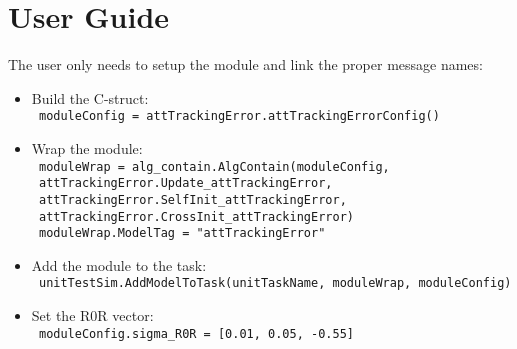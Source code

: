 
\section{User Guide}

The user only needs to setup the module and link the proper message names:

\begin{itemize}
\item Build the C-struct: \\
\texttt{    moduleConfig = attTrackingError.attTrackingErrorConfig()}
\item Wrap the module: \\
\texttt{  moduleWrap = alg\_contain.AlgContain(moduleConfig,} \\
\texttt{  attTrackingError.Update\_attTrackingError,} \\
\texttt{ attTrackingError.SelfInit\_attTrackingError,} \\
\texttt{ attTrackingError.CrossInit\_attTrackingError)} \\
\texttt{ moduleWrap.ModelTag = "attTrackingError"} 
\item Add the module to the task: \\
 \texttt{ unitTestSim.AddModelToTask(unitTaskName, moduleWrap, moduleConfig)}
\item  Set the R0R vector: \\
\texttt{    moduleConfig.sigma\_R0R  = [0.01, 0.05, -0.55]}
\end{itemize}